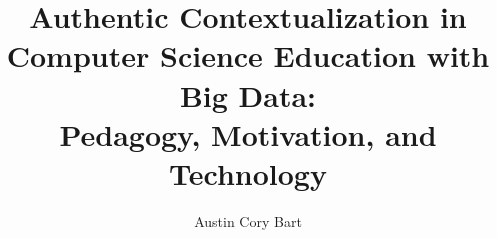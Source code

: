 \documentclass[onecolumn,12pt]{article}
\begin{document}
    
\title{Authentic Contextualization in \\Computer Science Education with Big Data:\\ Pedagogy, Motivation, and Technology} 

\author{Austin Cory Bart}
\maketitle     
    
\newpage   


    
\newpage
{}
\setcounter{page}{1}
        
    
    
    
    
    
    
    
    
    
    
\newpage
\setcounter{page}{1}

    
    
    
        
\end{document}
